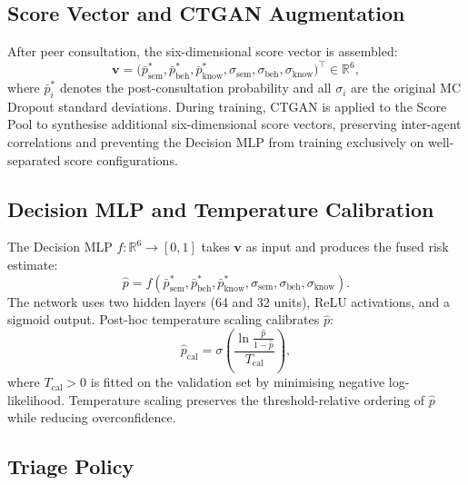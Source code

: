 \subsection{Score Vector and CTGAN Augmentation}

After peer consultation, the six-dimensional score vector is assembled:
\begin{equation}
\mathbf{v} = \bigl(\bar{p}_\text{sem}^*, \bar{p}_\text{beh}^*, \bar{p}_\text{know}^*, \sigma_\text{sem}, \sigma_\text{beh}, \sigma_\text{know}\bigr)^\top \in \mathbb{R}^6,
\label{eq:tifs_scorevec}
\end{equation}
where $\bar{p}_i^*$ denotes the post-consultation probability and all $\sigma_i$ are the original MC Dropout standard deviations. During training, CTGAN \cite{xu2019ctgan} is applied to the Score Pool to synthesise additional six-dimensional score vectors, preserving inter-agent correlations and preventing the Decision MLP from training exclusively on well-separated score configurations.

\subsection{Decision MLP and Temperature Calibration}

The Decision MLP $f: \mathbb{R}^6 \to [0,1]$ takes $\mathbf{v}$ as input and produces the fused risk estimate:
\begin{equation}
\hat{p} = f(\bar{p}_\text{sem}^*, \bar{p}_\text{beh}^*, \bar{p}_\text{know}^*, \sigma_\text{sem}, \sigma_\text{beh}, \sigma_\text{know}).
\label{eq:tifs_fused}
\end{equation}
The network uses two hidden layers (64 and 32 units), ReLU activations, and a sigmoid output. Post-hoc temperature scaling \cite{guo2017calibration} calibrates $\hat{p}$:
\begin{equation}
\hat{p}_\text{cal} = \sigma\!\left(\frac{\ln\frac{\hat{p}}{1-\hat{p}}}{T_\text{cal}}\right),
\label{eq:tifs_temperature}
\end{equation}
where $T_\text{cal} > 0$ is fitted on the validation set by minimising negative log-likelihood. Temperature scaling preserves the threshold-relative ordering of $\hat{p}$ while reducing overconfidence.

\subsection{Triage Policy}

